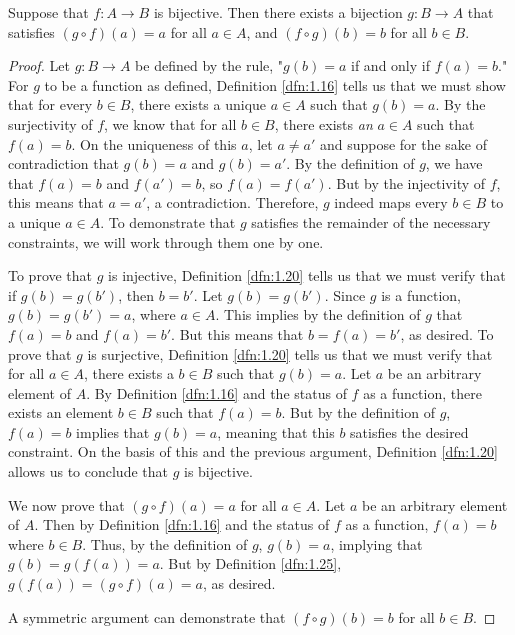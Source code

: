 \documentclass[../main.tex]{subfiles}
\begin{document}
\begin{proposition}\label{prp:1.27}
    Suppose that $f:A\to B$ is bijective. Then there exists a bijection $g:B\to A$ that satisfies $(g\circ f)(a)=a$ for all $a\in A$, and $(f\circ g)(b)=b$ for all $b\in B$.
    \begin{proof}
        Let $g:B\to A$ be defined by the rule, "$g(b)=a$ if and only if $f(a)=b$." For $g$ to be a function as defined, Definition \ref{dfn:1.16} tells us that we must show that for every $b\in B$, there exists a unique $a\in A$ such that $g(b)=a$. By the surjectivity of $f$, we know that for all $b\in B$, there exists \emph{an} $a\in A$ such that $f(a)=b$. On the uniqueness of this $a$, let $a\neq a'$ and suppose for the sake of contradiction that $g(b)=a$ and $g(b)=a'$. By the definition of $g$, we have that $f(a)=b$ and $f(a')=b$, so $f(a)=f(a')$. But by the injectivity of $f$, this means that $a=a'$, a contradiction. Therefore, $g$ indeed maps every $b\in B$ to a unique $a\in A$. To demonstrate that $g$ satisfies the remainder of the necessary constraints, we will work through them one by one.\par
        To prove that $g$ is injective, Definition \ref{dfn:1.20} tells us that we must verify that if $g(b)=g(b')$, then $b=b'$. Let $g(b)=g(b')$. Since $g$ is a function, $g(b)=g(b')=a$, where $a\in A$. This implies by the definition of $g$ that $f(a)=b$ and $f(a)=b'$. But this means that $b=f(a)=b'$, as desired. To prove that $g$ is surjective, Definition \ref{dfn:1.20} tells us that we must verify that for all $a\in A$, there exists a $b\in B$ such that $g(b)=a$. Let $a$ be an arbitrary element of $A$. By Definition \ref{dfn:1.16} and the status of $f$ as a function, there exists an element $b\in B$ such that $f(a)=b$. But by the definition of $g$, $f(a)=b$ implies that $g(b)=a$, meaning that this $b$ satisfies the desired constraint. On the basis of this and the previous argument, Definition \ref{dfn:1.20} allows us to conclude that $g$ is bijective.\par
        We now prove that $(g\circ f)(a)=a$ for all $a\in A$. Let $a$ be an arbitrary element of $A$. Then by Definition \ref{dfn:1.16} and the status of $f$ as a function, $f(a)=b$ where $b\in B$. Thus, by the definition of $g$, $g(b)=a$, implying that $g(b)=g(f(a))=a$. But by Definition \ref{dfn:1.25}, $g(f(a))=(g\circ f)(a)=a$, as desired.\par
        A symmetric argument can demonstrate that $(f\circ g)(b)=b$ for all $b\in B$.
    \end{proof}
\end{proposition}
\end{document}
